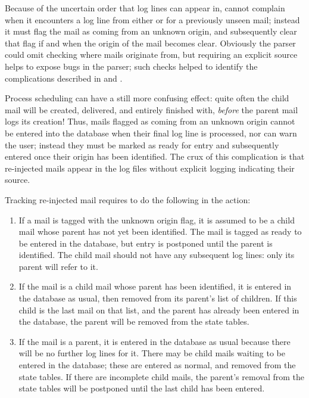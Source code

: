 Because of the uncertain order that log lines can appear in, \parsername{}
cannot complain when it encounters a log line from either  or
 for a previously unseen mail; instead it must flag the
mail as coming from an unknown origin, and subsequently clear that flag if
and when the origin of the mail becomes clear.  Obviously the parser could
omit checking where mails originate from, but requiring an explicit source
helps to expose bugs in the parser; such checks helped to identify the
complications described in  and
.

Process scheduling can have a still more confusing effect: quite often the
child mail will be created, delivered, and entirely finished with,
\textit{before\/} the parent mail logs its creation!  Thus, mails flagged
as coming from an unknown origin cannot be entered into the database when
their final log line is processed, nor can \parsername{} warn the user;
instead they must be marked as ready for entry and subsequently entered
once their origin has been identified.  The crux of this complication is
that re-injected mails appear in the log files without explicit logging
indicating their source.

Tracking re-injected mail requires \parsername{} to do the following in the
 action:

\begin{enumerate}

    \item If a mail is tagged with the unknown origin flag, it is assumed
        to be a child mail whose parent has not yet been identified.  The
        mail is tagged as ready to be entered in the database, but entry is
        postponed until the parent is identified.  The child mail should
        not have any subsequent log lines: only its parent will refer to
        it.

    \item If the mail is a child mail whose parent has been identified, it
        is entered in the database as usual, then removed from its parent's
        list of children.  If this child is the last mail on that list, and
        the parent has already been entered in the database, the parent
        will be removed from the state tables.

    \item If the mail is a parent, it is entered in the database as usual
        because there will be no further log lines for it.  There may be
        child mails waiting to be entered in the database; these are
        entered as normal, and removed from the state tables.  If there are
        incomplete child mails, the parent's removal from the state tables
        will be postponed until the last child has been entered.

\end{enumerate}

